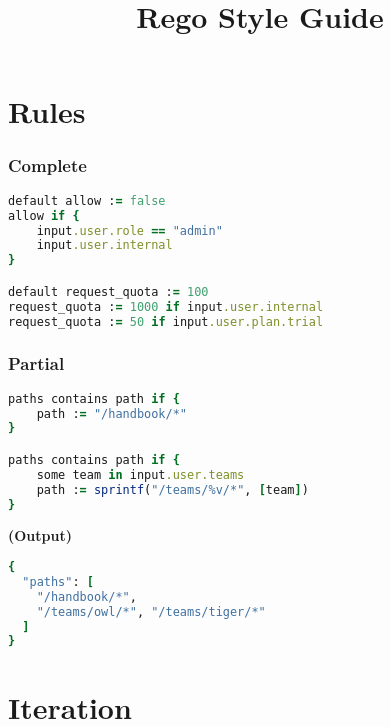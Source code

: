 \documentclass[twocolumn]{article}
\makeatletter
\renewcommand{\maketitle}{\bgroup\setlength{\parindent}{0pt}
\textbf{\LARGE{\@title}}
}
\makeatother
\begin{document}
\pagestyle{logo}
\title{Rego Style Guide}

\maketitle
\vspace{-1em}





\section*{Rules}




\vspace{-1em}
\subsubsection*{Complete}

\begin{lstlisting}[language=Ruby]
default allow := false
allow if {
	input.user.role == "admin"
	input.user.internal
}

default request_quota := 100
request_quota := 1000 if input.user.internal
request_quota := 50 if input.user.plan.trial
\end{lstlisting}





\vspace{-1em}
\subsubsection*{Partial}

\begin{lstlisting}[language=Ruby]
paths contains path if {
	path := "/handbook/*"
}

paths contains path if {
	some team in input.user.teams
	path := sprintf("/teams/%v/*", [team])
}
\end{lstlisting}



\textbf{\tiny{(Output)}}
\begin{lstlisting}[language=Ruby]
{
  "paths": [
    "/handbook/*",
    "/teams/owl/*", "/teams/tiger/*"
  ]
}
\end{lstlisting}







\section*{Iteration}
\end{document}

